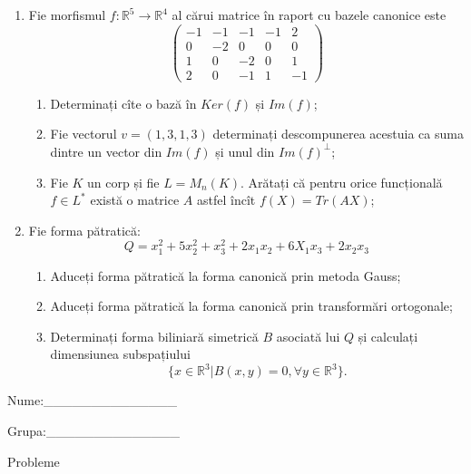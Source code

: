 \documentclass{article}
\begin{document}
\begin{enumerate}
 \item Fie morfismul $f:\mathbb{R}^5 \to \mathbb{R}^4$ al cărui matrice în raport cu bazele canonice este
$$\begin{pmatrix}
-1&-1&-1&-1&2\\
0&-2&0&0&0\\
1&0&-2&0&1\\
2&0&-1&1&-1
\end{pmatrix}$$

\begin{enumerate}
\item Determinați cîte o bază în $Ker(f)$ și $Im(f)$;
\item Fie vectorul $v=(1,3,1,3)$ determinați descompunerea acestuia ca suma dintre un vector din $Im(f)$ și unul din $Im(f)^\perp$;
\item Fie $K$ un corp și fie $L=M_n(K)$. Arătați că pentru orice funcțională $f \in L^*$ există o matrice $A$ astfel încît $f(X)=Tr(AX)$;
\end{enumerate}
\item Fie forma pătratică:
$$Q= x_1^2+5x_2^2+x_3^2+2x_1x_2+6X_1x_3+2x_2x_3$$

\begin{enumerate}
\item Aduceți forma pătratică la forma canonică prin metoda Gauss;
\item Aduceți forma pătratică la forma canonică prin transformări ortogonale;
\item Determinați forma biliniară simetrică $B$ asociată lui $Q$ și calculați dimensiunea subspațiului
$$\{x \in \mathbb{R}^3 | B(x,y)=0,\forall y \in \mathbb{R}^3\}.$$

\end{enumerate}
\end{enumerate}
\newpage
\begin{flushright}
Nume:\_\_\_\_\_\_\_\_\_\_\_\_\_\_
 
 
Grupa:\_\_\_\_\_\_\_\_\_\_\_\_\_\_
\end{flushright}
\begin{center}
\vspace{2cm}
{\Large Probleme}
\vspace{2cm}
\end{center}
\end{document}
